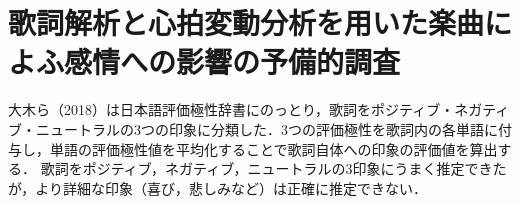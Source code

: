 \section{歌詞解析と心拍変動分析を用いた楽曲によふ感情への影響の予備的調査}
大木ら（2018）\cite{10}は日本語評価極性辞書にのっとり，歌詞をポジティブ・ネガティブ・ニュートラルの3つの印象に分類した．3つの評価極性を歌詞内の各単語に付与し，単語の評価極性値を平均化することで歌詞自体への印象の評価値を算出する．
歌詞をポジティブ，ネガティブ，ニュートラルの3印象にうまく推定できたが，より詳細な印象（喜び，悲しみなど）は正確に推定できない．